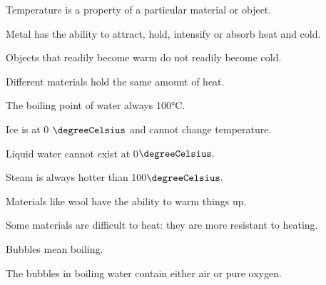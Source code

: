\documentclass[10pt]{examdesign}
\begin{document}
\begin{truefalse}[title={True or False},
	rearrange=yes]
\begin{question}
	 Temperature is a property of a particular material or object.  
\end{question}

\begin{question}
	  Metal has the ability to attract, hold, intensify or absorb heat and cold.  
\end{question}


\begin{question}
	 Objects that readily become warm do not readily become cold.   
\end{question}

\begin{question}
	 Different materials hold the same amount of heat.  
\end{question}
\begin{question}
	 The boiling point of water always 100°C.  
\end{question}

\begin{question}
	 Ice is at 0 $\degreeCelsius$ and cannot change temperature.   
\end{question}

\begin{question}
	 Liquid water cannot exist at 0$\degreeCelsius. $
\end{question}

\begin{question}
	 Steam is always hotter than 100$\degreeCelsius. $
\end{question}



\begin{question}
	 Materials like wool have the ability to warm things up. 
\end{question}

\begin{question}
	  Some materials are difficult to heat: they are more resistant to heating.  
\end{question}
\begin{question}
	 Bubbles mean boiling. 
\end{question}
\begin{question}
	 The bubbles in boiling water contain either air or pure oxygen.  
\end{question}


\end{truefalse}
\end{document}
